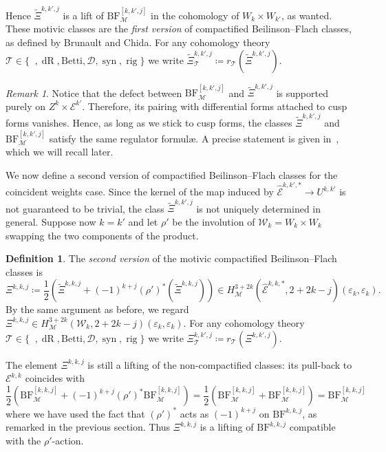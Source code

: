 \documentclass[11pt, a4paper, reqno]{amsart}
\theoremstyle{definition}
\newtheorem{definition}{Definition}[subsection]
\theoremstyle{plain}
\theoremstyle{remark}
\newtheorem*{remark}{Remark}
\DeclareMathOperator{\et}{\acute{e}t}
\DeclareMathOperator{\syn}{syn}
\DeclareMathOperator{\rig}{rig}
\DeclareMathOperator{\dR}{dR}
\DeclareMathOperator{\mot}{\mathscr{M}}
\renewcommand{\epsilon}{\varepsilon}
\newcommand{\Ell}{\mathcal{E}}
\newcommand{\KS}{\mathscr{W}}
\newcommand{\theory}{\mathcal{T}}
\newcommand{\BF}{\mathrm{BF}}
\newcommand{\lcBF}{\widetilde{\Xi}}
\newcommand{\cBF}{\Xi}
\newcommand{\del}{\mathcal{D}}
\newcommand{\regulator}[1]{r_{#1}}
\begin{document}
Hence $\lcBF^{k,k',j}$ is a lift of $\BF^{[k,k',j]}_{\mot}$ in the cohomology of $W_k\times W_{k'}$, as wanted. These motivic classes are the \emph{first version} of compactified Beilinson--Flach classes, as defined by Brunault and Chida. For any cohomology theory $\theory\in\{\et,\dR,\mathrm{Betti},\del,\syn,\rig\}$ we write $\lcBF^{k,k',j}_{\theory} \coloneqq \regulator{\theory}(\lcBF^{k,k',j})$.
\begin{remark}
    \label{rmk:pairing-unchanged}
    Notice that the defect between $\BF^{[k,k',j]}_{\mot}$ and $\lcBF^{k,k',j}$ is supported purely on $Z^k\times \Ell^{k'}$. Therefore, its pairing with differential forms attached to cusp forms vanishes. Hence, as long as we stick to cusp forms, the classes $\lcBF^{k,k',j}$ and $\BF^{[k,k',j]}_{\mot}$ satisfy the same regulator formulæ. A precise statement is given in~\cite[Proposition~9.4]{brunaultchida16}, which we will recall later.
\end{remark}

We now define a second version of compactified Beilinson--Flach classes for the coincident weights case. Since the kernel of the map induced by $\hat{\Ell}^{k,k',*} \to U^{k,k'}$ is not guaranteed to be trivial, the class $\lcBF^{k,k',j}$ is not uniquely determined in general. Suppose now $k=k'$ and let $\rho'$ be the involution of $\KS_k = W_k\times W_k$ swapping the two components of the product.

 \begin{definition}
  The \emph{second version} of the motivic compactified Beilinson--Flach classes is
  \[
      \cBF^{k,k,j} \coloneqq \frac{1}{2}(\lcBF^{k,k,j} + (-1)^{k+j}(\rho')^*(\lcBF^{k,k,j})) \in H^{3+2k}_{\mot}(\hat{\Ell}^{k,k,*},2+2k-j)(\epsilon_k,\epsilon_k).
  \]
  By the same argument as before, we regard $\cBF^{k,k,j}\in H^{3+2k}_{\mot}(\KS_k,2+2k-j)(\epsilon_k,\epsilon_k)$. For any cohomology theory $\theory\in\{\et,\dR,\mathrm{Betti},\del,\syn,\rig\}$ we write $\cBF^{k,k',j}_{\theory} \coloneqq \regulator{\theory}(\cBF^{k,k',j})$.
 \end{definition}

 The element $\cBF^{k,k,j}$ is still a lifting of the non-compactified classes: its pull-back to $\Ell^{k,k}$ coincides with
 \[
  \frac{1}{2}(\BF^{[k,k,j]}_{\mot} + (-1)^{k+j}(\rho')^*\BF^{[k,k,j]}_{\mot}) = \frac{1}{2}(\BF^{[k,k,j]}_{\mot} + \BF^{[k,k,j]}_{\mot}) = \BF^{[k,k,j]}_{\mot}
 \]
 where we have used the fact that $(\rho')^*$ acts as $(-1)^{k+j}$ on $\BF^{k,k,j}$, as remarked in the previous section. Thus $\cBF^{k,k,j}$ is a lifting of $\BF^{k,k,j}$ compatible with the $\rho'$-action.
\end{document}
